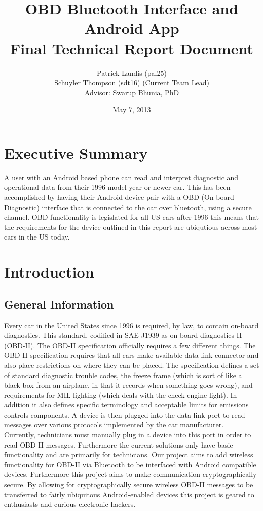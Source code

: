 \documentclass[12pt,letterpaper]{article}
\title{
\textbf{\LARGE OBD Bluetooth Interface and Android App} \\
\Large Final Technical Report Document
}
\author{
\normalsize Patrick Landis (pal25) \\
\normalsize Schuyler Thompson (sdt16) (Current Team Lead) \\
\normalsize Advisor: Swarup Bhunia, PhD
}
\date{\normalsize May 7, 2013}
\begin{document}
\maketitle

\section*{Executive Summary}
A user with an Android based phone can read and interpret diagnostic and operational data from their 1996 model year or newer car. This has been accomplished by having their Android device pair with a OBD (On-board Diagnostic) interface that is connected to the car over bluetooth, using a secure channel. OBD functionality is legislated for all US cars after 1996 this means that the requirements for the device outlined in this report are ubiqutious across most cars in the US today.

\newpage

\tableofcontents

\newpage

\section{Introduction}
\subsection{General Information}
Every car in the United States since 1996 is required, by law, to contain on-board diagnostics. This standard, codified in SAE J1939 as on-board diagnostics II (OBD-II). The OBD-II specification officially requires a few different things. The OBD-II specification requires that all cars make available data link connector and also place restrictions on where they can be placed. The specification defines a set of standard diagnostic trouble codes, the freeze frame (which is sort of like a black box from an airplane, in that it records when something goes wrong), and requirements for MIL lighting (which deals with the check engine light). In addition it also defines specific terminology and acceptable limits for emissions controls components. A device is then plugged into the data link port to read messages over various protocols implemented by the car manufacturer. \\

Currently, technicians must manually plug in a device into this port in order to read OBD-II messages. Furthermore the current solutions only have basic functionality and are primarily for technicians. Our project aims to add wireless functionality for OBD-II via Bluetooth to be interfaced with Android compatible devices. Furthermore this project aims to make communication cryptographically secure. By allowing for cryptographically secure wireless OBD-II messages to be transferred to fairly ubiquitous Android-enabled devices this project is geared to enthusiasts and curious electronic hackers. \\
\end{document}
